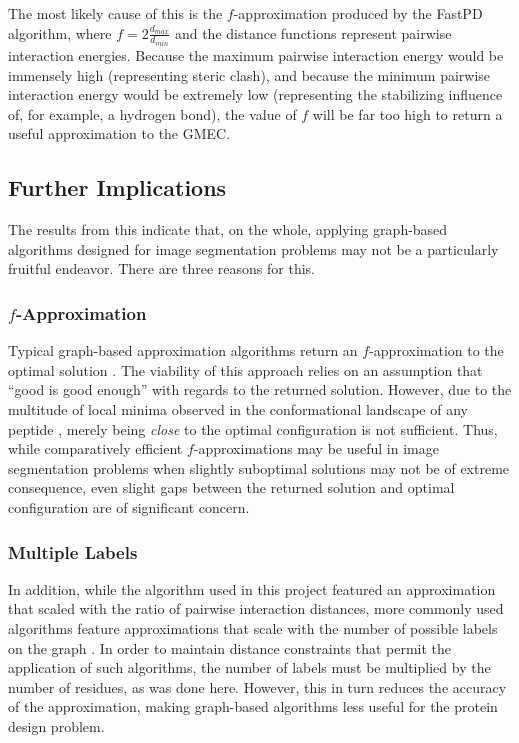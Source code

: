 \documentclass[11pt]{article}
\begin{document}
	The most likely cause of this is the $f$-approximation produced by the FastPD
	algorithm, where $f = 2 \frac{d_{max}}{d_{min}}$ and the distance functions
	represent pairwise interaction energies. Because the maximum pairwise interaction
	energy would be immensely high (representing steric clash), and because the
	minimum pairwise interaction energy would be extremely low (representing the 
	stabilizing influence of, for example, a hydrogen bond), the value of $f$ will
	be far too high to return a useful approximation to the GMEC. 
	
	\subsection{Further Implications}
	The results from this indicate that, on the whole, applying graph-based algorithms
	designed for image segmentation problems may not be a particularly fruitful
	endeavor. There are three reasons for this. 
	
	\subsubsection{$f$-Approximation}
	Typical graph-based approximation algorithms return an $f$-approximation to
	the optimal solution \cite{CKNZ}. The viability of this approach relies
	on an assumption that ``good is good enough'' with regards to the returned
	solution.  However, due to the multitude of local minima observed in the
	conformational landscape of any peptide \cite{DCM0}, merely being \textit{close}
	to the optimal configuration is not sufficient. Thus, while comparatively
	efficient $f$-approximations may be useful in image segmentation problems 
	when slightly suboptimal solutions may not be of extreme consequence, even
	slight gaps between the returned solution and optimal configuration are of
	significant concern. 
	
	\subsubsection{Multiple Labels}
	In addition, while the algorithm used in this project featured an approximation
	that scaled with the ratio of pairwise interaction distances, more commonly 
	used algorithms feature approximations that scale with the number of possible
	labels on the graph \cite{BVZ1}. In order to maintain distance constraints that
	permit the application of such algorithms, the number of labels must be 
	multiplied by the number of residues, as was done here. However, this in turn
	reduces the accuracy of the approximation, making graph-based algorithms less
	useful for the protein design problem. 	
	
\end{document}
